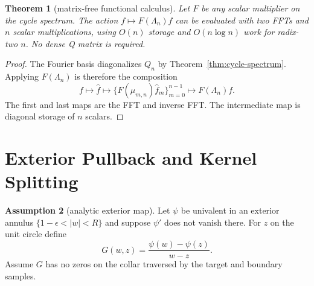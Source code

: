 \documentclass[10pt,leqno]{article}
\numberwithin{equation}{section}
\theoremstyle{plain}
\newtheorem{theorem}{Theorem}[section]
\theoremstyle{definition}
\newtheorem{assumption}[theorem]{Assumption}
\theoremstyle{remark}
\newcommand{\Qop}{Q}
\newcommand{\Lam}{\Lambda}
\begin{document}
\begin{theorem}[matrix-free functional calculus]\label{thm:matrix-free}
Let $F$ be any scalar multiplier on the cycle spectrum.  The action $f\mapsto F(\Lam_n)f$ can be evaluated with two FFTs and $n$ scalar multiplications, using $O(n)$ storage and $O(n\log n)$ work for radix-two $n$.  No dense Q matrix is required.
\end{theorem}
\begin{proof}
The Fourier basis diagonalizes $\Qop_n$ by Theorem~\ref{thm:cycle-spectrum}.  Applying $F(\Lam_n)$ is therefore the composition
\[
f\mapsto \widehat f\mapsto \{F(\mu_{m,n})\widehat f_m\}_{m=0}^{n-1}\mapsto F(\Lam_n)f.
\]
The first and last maps are the FFT and inverse FFT.  The intermediate map is diagonal storage of $n$ scalars.
\end{proof}
\par\noindent{}\par
\section{Exterior Pullback and Kernel Splitting}
\begin{assumption}[analytic exterior map]\label{ass:analytic-map}
Let $\psi$ be univalent in an exterior annulus $\{1-\epsilon<|w|<R\}$ and suppose $\psi'$ does not vanish there.  For $z$ on the unit circle define
\[
G(w,z)=\frac{\psi(w)-\psi(z)}{w-z}.
\]
Assume $G$ has no zeros on the collar traversed by the target and boundary samples.
\end{assumption}
\end{document}
